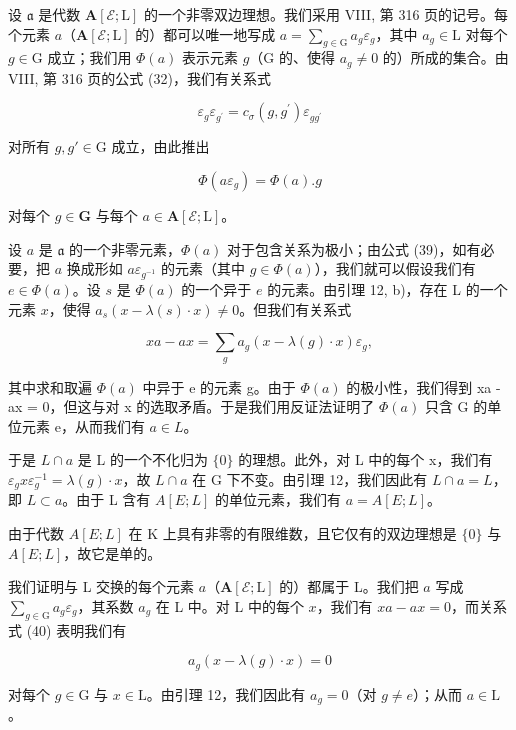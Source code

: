 设 \(\mathfrak{a}\) 是代数 \(\mathbf{A}[\mathcal{E};\mathrm{L}]\) 的一个非零双边理想。我们采用 VIII, 第 316 页的记号。每个元素 \(a\)（\(\mathbf{A}[\mathcal{E};\mathrm{L}]\) 的）都可以唯一地写成 \(a = \sum_{g\in \mathrm{G}}a_g\varepsilon_g\)，其中 \(a_g\in \mathrm{L}\) 对每个 \(g\in \mathrm{G}\) 成立；我们用 \(\Phi (a)\) 表示元素 \(g\)（\(\mathrm{G}\) 的、使得 \(a_g\neq 0\) 的）所成的集合。由 VIII, 第 316 页的公式 (32)，我们有关系式

\[
\varepsilon_ {g} \varepsilon_ {g ^ {\prime}} = c _ {\sigma} (g, g ^ {\prime}) \varepsilon_ {g g ^ {\prime}}\tag{38}
\]

对所有 \(g, g' \in \mathrm{G}\) 成立，由此推出

\[
\Phi (a \varepsilon_ {g}) = \Phi (a). g\tag{39}
\]

对每个 \(g\in \mathbf{G}\) 与每个 \(a\in \mathbf{A}[\mathcal{E};\mathrm{L}]\)。

设 \(a\) 是 \(\mathfrak{a}\) 的一个非零元素，\(\Phi(a)\) 对于包含关系为极小；由公式 (39)，如有必要，把 \(a\) 换成形如 \(a\varepsilon_{g^{-1}}\) 的元素（其中 \(g\in\Phi(a)\)），我们就可以假设我们有 \(e\in\Phi(a)\)。设 \(s\) 是 \(\Phi(a)\) 的一个异于 \(e\) 的元素。由引理 12, b)，存在 L 的一个元素 \(x\)，使得 \(a_s(x-\lambda(s)\cdot x)\neq0\)。但我们有关系式

\[
x a - a x = \sum_ {g} a _ {g} (x - \lambda (g) \cdot x) \varepsilon_ {g},\tag{40}
\]

其中求和取遍 \(\Phi(a)\) 中异于 e 的元素 g。由于 \(\Phi(a)\) 的极小性，我们得到 xa - ax = 0，但这与对 x 的选取矛盾。于是我们用反证法证明了 \(\Phi(a)\) 只含 G 的单位元素 e，从而我们有 \(a \in L\)。

于是 \(L \cap a\) 是 L 的一个不化归为 \(\{0\}\) 的理想。此外，对 L 中的每个 x，我们有 \(\varepsilon_{g}x\varepsilon_{g}^{-1} = \lambda(g) \cdot x\)，故 \(L \cap a\) 在 G 下不变。由引理 12，我们因此有 \(L \cap a = L\)，即 \(L \subset a\)。由于 L 含有 \(A[E;L]\) 的单位元素，我们有 \(a = A[E;L]\)。

由于代数 \(A[E;L]\) 在 K 上具有非零的有限维数，且它仅有的双边理想是 \(\{0\}\) 与 \(A[E;L]\)，故它是单的。

我们证明与 L 交换的每个元素 \(a\)（\(\mathbf{A}[\mathcal{E};\mathrm{L}]\) 的）都属于 L。我们把 \(a\) 写成 \(\sum_{g\in \mathrm{G}}a_g\varepsilon_g\)，其系数 \(a_{g}\) 在 L 中。对 L 中的每个 \(x\)，我们有 \(xa - ax = 0\)，而关系式 (40) 表明我们有

\[
a _ {g} (x - \lambda (g) \cdot x) = 0\tag{41}
\]

对每个 \(g \in \mathrm{G}\) 与 \(x \in \mathrm{L}\)。由引理 12，我们因此有 \(a_g = 0\)（对 \(g \neq e\)）；从而 \(a \in \mathrm{L}\)。

